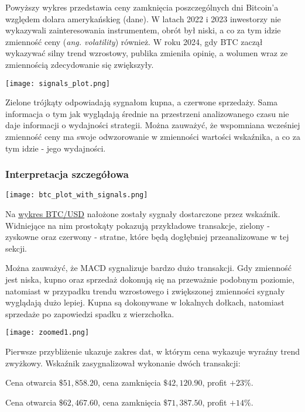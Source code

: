 \documentclass[11pt]{article}
\newcounter{boxlblcounter}
\newcommand{\makeboxlabel}[1]{\fbox{#1.}\hfill}%
\newenvironment{boxlabel}
  {\begin{list}
    {\arabic{boxlblcounter}}
    {\usecounter{boxlblcounter}
     \setlength{\labelwidth}{3em}
     \setlength{\labelsep}{0em}
     \setlength{\itemsep}{2pt}
     \setlength{\leftmargin}{1.5cm}
     \setlength{\rightmargin}{2cm}
     \setlength{\itemindent}{0em} 
     \let\makelabel=\makeboxlabel
    }
  }
{\end{list}}
\begin{document}
    Powyższy wykres przedstawia ceny zamknięcia poszczególnych dni Bitcoin'a względem dolara amerykańskieg (dane\cite{data:btc}).
    W latach 2022 i 2023 inwestorzy nie wykazywali zainteresowania instrumentem, obrót był niski, a co za tym idzie zmienność ceny (\textit{ang. volatility}) również. 
    W roku 2024, gdy BTC zaczął wykazywać silny trend wzrostowy, publika zmieniła opinię, a wolumen wraz ze zmiennością zdecydowanie się zwiększyły. 
    
    \begin{center}
        \texttt{[image: signals\_plot.png]}
    \end{center}

    Zielone trójkąty odpowiadają sygnałom kupna, a czerwone sprzedaży.
    Sama informacja o tym jak wyglądają średnie na przestrzeni analizowanego czasu nie daje informacji o wydajności strategii. Można zauważyć, że wspomniana wcześniej zmienność ceny ma swoje odwzorowanie w zmienności wartości wskaźnika, a co za tym idzie - jego wydajności.


    \subsubsection{Interpretacja szczegółowa}
    \begin{center}
        \texttt{[image: btc\_plot\_with\_signals.png]}
    \end{center}

    Na \hyperlink{png:btcusd}{wykres BTC/USD} nałożone zostały sygnały dostarczone przez wskaźnik. 
    Widniejące na nim prostokąty pokazują przykładowe transakcje, zielony - zyskowne oraz czerwony - stratne, które będą dogłębniej przeanalizowane w tej sekcji.
    
    Można zauważyć, że MACD sygnalizuje bardzo dużo transakcji. 
    Gdy zmienność jest niska, kupno oraz sprzedaż dokonują się na przeważnie podobnym poziomie, natomiast w przypadku trendu wzrostowego i zwiększonej zmienności sygnały wyglądają dużo lepiej. Kupna są dokonywane w lokalnych dołkach, natomiast sprzedaże po zapowiedzi spadku z wierzchołka.
    
    \begin{center}
        \texttt{[image: zoomed1.png]}
    \end{center}

    Pierwsze przybliżenie ukazuje zakres dat, w którym cena wykazuje wyraźny trend zwyżkowy. 
    Wskaźnik zasygnalizował wykonanie dwóch transakcji:
    \begin{boxlabel}
        \item Cena otwarcia $\$51,858.20$, cena zamknięcia $\$42,120.90$, profit $+23\%$.
        \item Cena otwarcia $\$62,467.60$, cena zamknięcia $\$71,387.50$, profit $+14\%$. 
    \end{boxlabel}
    
\end{document}
